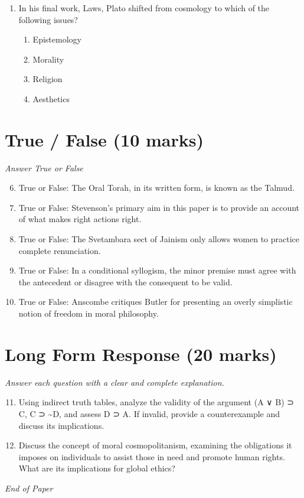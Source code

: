 \documentclass[12pt]{article}
\begin{document}
\begin{enumerate}[label=\arabic*.]
\begin{enumerate}[label=(\alph*)]
    \item justice
    \item fairness
    \item respect for other persons
    \item all of the above
\end{enumerate}
\item In his final work, Laws, Plato shifted from cosmology to which of the following issues?
\begin{enumerate}[label=(\alph*)]
    \item Epistemology
    \item Morality
    \item Religion
    \item Aesthetics
\end{enumerate}
\end{enumerate}

\section*{True / False (10 marks)}
\textit{Answer True or False}
\begin{enumerate}[label=\arabic*.]
\setcounter{enumi}{5}
\item True or False: The Oral Torah, in its written form, is known as the Talmud.
\item True or False: Stevenson's primary aim in this paper is to provide an account of what makes right actions right.
\item True or False: The Svetambara sect of Jainism only allows women to practice complete renunciation.
\item True or False: In a conditional syllogism, the minor premise must agree with the antecedent or disagree with the consequent to be valid.
\item True or False: Anscombe critiques Butler for presenting an overly simplistic notion of freedom in moral philosophy.
\end{enumerate}

\section*{Long Form Response (20 marks)}
\textit{Answer each question with a clear and complete explanation.}
\begin{enumerate}[label=\arabic*.]
\setcounter{enumi}{10}
\item Using indirect truth tables, analyze the validity of the argument (A ∨ B) ⊃ C, C ⊃ \textasciitilde{}D, and assess D ⊃ A. If invalid, provide a counterexample and discuss its implications.
\item Discuss the concept of moral cosmopolitanism, examining the obligations it imposes on individuals to assist those in need and promote human rights. What are its implications for global ethics?
\end{enumerate}

\vfill
\noindent\textit{End of Paper}
\end{document}
